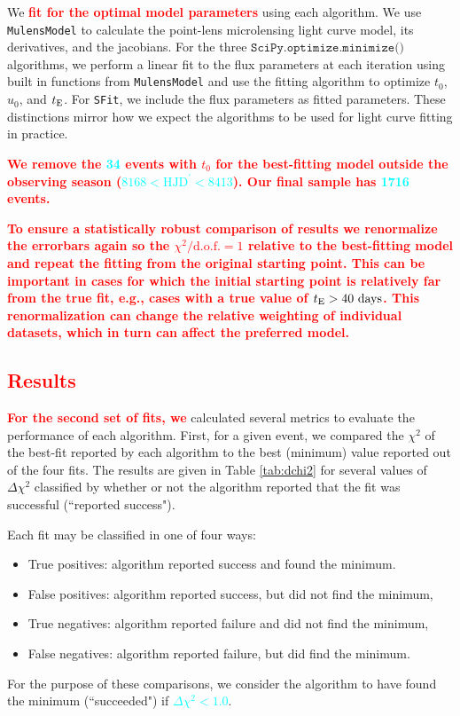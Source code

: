 \documentclass[preprint]{aastex631}
\newcommand{\HL}[1]{\textcolor{red}{\bf#1}}
\newcommand{\num}[1]{\textcolor{cyan}{\bf#1}}
\newcommand{\minimize}{$\texttt{SciPy.optimize.minimize()}$}
\newcommand{\sfit}{\texttt{SFit}}
\begin{document}
We \HL{fit for the optimal model parameters} using each algorithm. We use \texttt{MulensModel} \citep{MulensModel} to calculate the point-lens microlensing light curve model, its derivatives, and the jacobians.  For the three \minimize\, algorithms, we perform a linear fit to the flux parameters at each iteration using built in functions from \texttt{MulensModel} and use the fitting algorithm to optimize $t_0$, $u_0$, and $t_{\rm E}$. For \sfit, we include the flux parameters as fitted parameters. These distinctions mirror how we expect the algorithms to be used for light curve fitting in practice.

\HL{We remove the \num{34} events with $t_0$ for the best-fitting model outside the observing season (\num{$8168 < \mathrm{HJD}^\prime < 8413$}). Our final sample has \num{1716} events.}

\HL{To ensure a statistically robust comparison of results we renormalize the errorbars again so the $\chi^2/\mathrm{d.o.f.} = 1$ relative to the best-fitting model and repeat the fitting from the original starting point. This can be important in cases for which the initial starting point is relatively far from the true fit, e.g., cases with a true value of $t_{\rm E} > 40~\mathrm{days}$. This renormalization can change the relative weighting of individual datasets, which in turn can affect the preferred model.}

\subsection{\HL{Results}}

\HL{For the second set of fits, we} calculated several metrics to evaluate the performance of each algorithm. First, for a given event, we compared the $\chi^2$ of the best-fit reported by each algorithm to the best (minimum) value reported out of the four fits. The results are given in Table \ref{tab:dchi2} for several values of $\Delta\chi^2$ classified by whether or not the algorithm reported that the fit was successful (``reported success").

Each fit may be classified in one of four ways:
\begin{itemize}
\item{True positives: algorithm reported success and found the minimum.}
\item{False positives: algorithm reported success, but did not find the minimum,}
\item{True negatives: algorithm reported failure and did not find the minimum,}
\item{False negatives: algorithm reported failure, but did find the minimum.}
\end{itemize}
For the purpose of these comparisons, we consider the algorithm to have found the minimum (``succeeded") if \num{$\Delta\chi^2 < 1.0$}.
\end{document}

